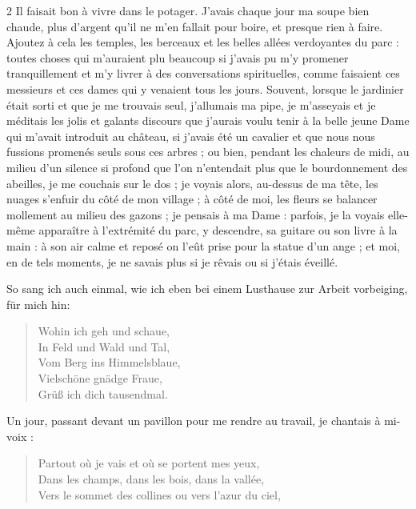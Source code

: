 \documentclass[a4paper,11pt]{article}
\newcommand\chunks[2]{%
\begin{leftcolumn*}\begin{otherlanguage}{german}%
{#1}%
\end{otherlanguage}\end{leftcolumn*}%
\begin{rightcolumn}\begin{otherlanguage}{french}%
{#2}%
\end{otherlanguage}\end{rightcolumn}%
}
\begin{document}
\begin{paracol}{2}
         {Il faisait bon à vivre dans le potager. J’avais chaque jour ma soupe bien chaude, plus d’argent qu’il ne m’en fallait pour boire, et presque rien à faire. Ajoutez à cela les temples, les berceaux et les belles allées verdoyantes du parc : toutes choses qui m’auraient plu beaucoup si j’avais pu m’y promener tranquillement et m’y livrer à des conversations spirituelles, comme faisaient ces messieurs et ces dames qui y venaient tous les jours. Souvent, lorsque le jardinier était sorti et que je me trouvais seul, j’allumais ma pipe, je m’asseyais et je méditais les jolis et galants discours que j’aurais voulu tenir à la belle jeune Dame qui m’avait introduit au château, si j’avais été un cavalier et que nous nous fussions promenés seuls sous ces arbres ; ou bien, pendant les chaleurs de midi, au milieu d’un silence si profond que l’on n’entendait plus que le bourdonnement des abeilles, je me couchais sur le dos ; je voyais alors, au-dessus de ma tête, les nuages s’enfuir du côté de mon village ; à côté de moi, les fleurs se balancer mollement au milieu des gazons ; je pensais à ma Dame : parfois, je la voyais elle-même apparaître à l’extrémité du parc, y descendre, sa guitare ou son livre à la main : à son air calme et reposé on l’eût prise pour la statue d’un ange ; et moi, en de tels moments, je ne savais plus si je rêvais ou si j’étais éveillé.}
  \chunks{So sang ich auch einmal, wie ich eben bei einem Lusthause zur Arbeit vorbeiging, für mich hin:
\begin{verse}
Wohin ich geh und schaue,\\
In Feld und Wald und Tal,\\
Vom Berg ins Himmelsblaue,\\
Vielschöne gnädge Fraue,\\
Grüß ich dich tausendmal.
\end{verse}}
         {Un jour, passant devant un pavillon pour me rendre au travail, je chantais à mi-voix :
\begin{verse}
Partout où je vais et où se portent mes yeux,\\
Dans les champs, dans les bois, dans la vallée,\\
Vers le sommet des collines ou vers l’azur du ciel,\\

\end{verse}}
\end{paracol}
\end{document}
